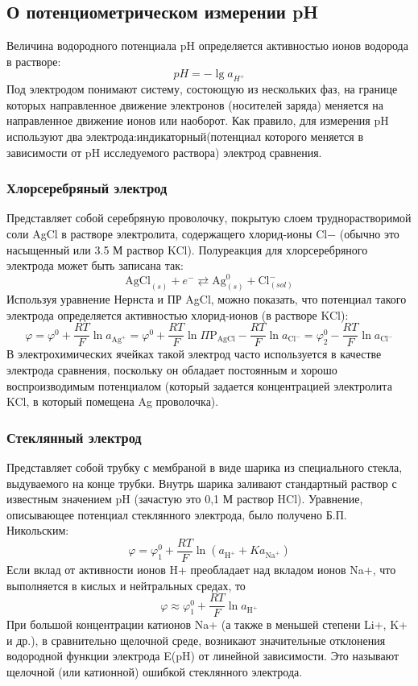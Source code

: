 \documentclass[a4paper, 12pt]{article}
\begin{document}
\subsection{О потенциометрическом измерении pH}
Величина водородного потенциала pH определяется активностью ионов водорода в растворе:
\begin{equation}
p H=-\lg a_{H^{+}}
\end{equation}
Под электродом понимают систему, состоющую из нескольких фаз, на границе которых направленное движение электронов (носителей заряда) меняется на направленное движение ионов или наоборот. Как правило, для измерения pH используют два электрода:индикаторный(потенциал которого меняется в зависимости от pH исследуемого раствора) электрод сравнения.
\subsubsection{Хлорсеребряный электрод}
Представляет собой серебряную проволочку, покрытую слоем труднорастворимой соли AgCl в растворе электролита, содержащего хлорид-ионы Cl− (обычно это насыщенный или 3.5 М раствор KCl). Полуреакция для хлорсеребряного электрода может быть записана так:
$$
\mathrm{AgCl}_{(s)}+e^{-} \rightleftarrows \mathrm{Ag}_{(s)}^{0}+\mathrm{Cl}_{(s o l)}^{-}
$$
Используя уравнение Нернста и ПР AgCl, можно показать, что потенциал такого электрода определяется активностью хлорид-ионов (в растворе KCl):
\begin{equation}
\varphi=\varphi^{0}+\frac{R T}{F} \ln a_{\mathrm{Ag}^{+}}=\varphi^{0}+\frac{R T}{F} \ln \Pi \mathrm{P}_{\mathrm{AgCl}}-\frac{R T}{F} \ln a_{\mathrm{Cl}^{-}}=\varphi_{2}^{0}-\frac{R T}{F} \ln a_{\mathrm{Cl}^{-}}
\end{equation}
В электрохимических ячейках такой электрод часто используется в качестве
электрода сравнения, поскольку он обладает постоянным и хорошо воспроизводимым потенциалом (который задается концентрацией электролита KCl, в который
помещена Ag проволочка). 
\subsubsection{Стеклянный электрод}
Представляет собой трубку с мембраной в виде шарика из специального стекла, выдуваемого на конце трубки. Внутрь шарика заливают стандартный раствор с известным значением pH (зачастую это 0,1 М раствор HCl). Уравнение, описывающее потенциал стеклянного электрода, было получено Б.П. Никольским:
\begin{equation}
\varphi=\varphi_{1}^{0}+\frac{R T}{F} \ln \left(a_{\mathrm{H}^{+}}+K a_{\mathrm{Na}^{+}}\right)
\end{equation}
Если вклад от активности ионов H+ преобладает над вкладом ионов Na+, что выполняется в кислых и нейтральных средах, то
\begin{equation}
\varphi \approx \varphi_{1}^{0}+\frac{R T}{F} \ln a_{\mathrm{H}^{+}}
\end{equation}
При большой концентрации катионов Na+ (а также в меньшей степени Li+, K+ и др.), в сравнительно щелочной среде, возникают значительные отклонения водородной функции электрода E(pH) от линейной зависимости. Это называют щелочной
(или катионной) ошибкой стеклянного электрода.
\end{document}
